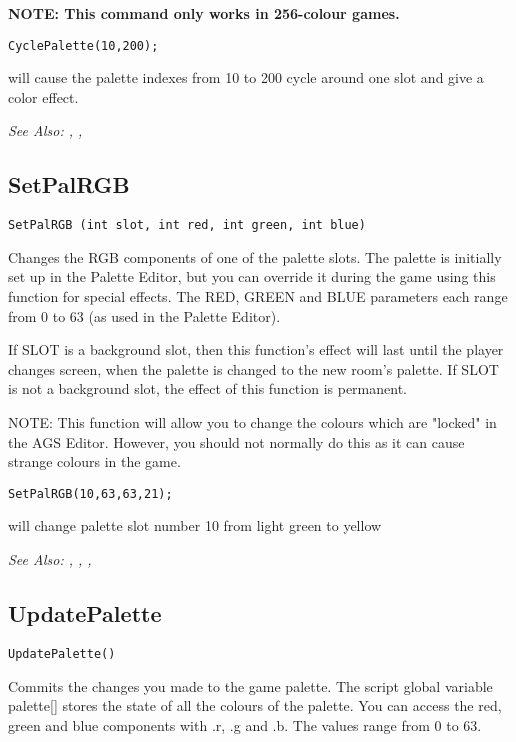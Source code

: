 \bf{NOTE:} This command only works in 256-colour games.

\begin{verbatim}
CyclePalette(10,200);
\end{verbatim}
will cause the palette indexes from 10 to 200 cycle around one slot and give a color effect.

\it{See Also:} , , 


\subsection{SetPalRGB}\label{SetPalRGB}%

\begin{verbatim}
SetPalRGB (int slot, int red, int green, int blue)
\end{verbatim}
Changes the RGB components of one of the palette slots. The palette is
initially set up in the Palette Editor, but you can override it during the game using
this function for special effects. The RED, GREEN and BLUE parameters each
range from 0 to 63 (as used in the Palette Editor).

If SLOT is a background slot, then this function's effect will last until
the player changes screen, when the palette is changed to the new room's
palette. If SLOT is not a background slot, the effect of this function is
permanent.

NOTE: This function will allow you to change the colours which are "locked"
in the AGS Editor. However, you should not normally do this as it can
cause strange colours in the game.

\begin{verbatim}
SetPalRGB(10,63,63,21);
\end{verbatim}
will change palette slot number 10 from light green to yellow

\it{See Also:} , , , 

\subsection{UpdatePalette}\label{UpdatePalette}%

\begin{verbatim}
UpdatePalette()
\end{verbatim}
Commits the changes you made to the game palette.
The script global variable  palette[]  stores the state of all the
colours of the palette. You can access the red, green and blue components
with .r, .g and .b. The values range from 0 to 63.

